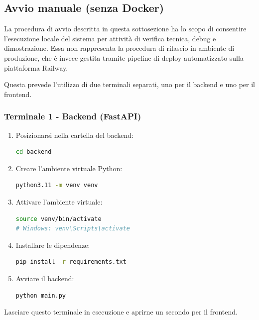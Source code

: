 \documentclass[a4paper, 11pt, oneside]{scrartcl}
\begin{document}
\subsection{Avvio manuale (senza Docker)}

La procedura di avvio descritta in questa sottosezione ha lo scopo di consentire l'esecuzione locale del sistema per attivit\`a di verifica tecnica, debug e dimostrazione. Essa non rappresenta la procedura di rilascio in ambiente di produzione, che \`e invece gestita tramite pipeline di deploy automatizzato sulla piattaforma Railway.

Questa prevede l'utilizzo di due terminali separati, uno per il backend e uno per il frontend.

\subsubsection{Terminale 1 - Backend (FastAPI)}
\begin{enumerate}
    \item Posizionarsi nella cartella del backend:
          \begin{lstlisting}[language=bash]
cd backend
\end{lstlisting}
    \item Creare l'ambiente virtuale Python:
          \begin{lstlisting}[language=bash]
python3.11 -m venv venv
\end{lstlisting}
    \item Attivare l'ambiente virtuale:
          \begin{lstlisting}[language=bash]
source venv/bin/activate
# Windows: venv\Scripts\activate
\end{lstlisting}
    \item Installare le dipendenze:
          \begin{lstlisting}[language=bash]
pip install -r requirements.txt
\end{lstlisting}
    \item Avviare il backend:
          \begin{lstlisting}[language=bash]
python main.py
\end{lstlisting}
\end{enumerate}

Lasciare questo terminale in esecuzione e aprirne un secondo per il frontend.
\end{document}
